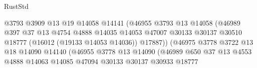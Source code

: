 \begin{lexlean}{RustStd}
\begin{coremodule}
                                            @3793
                                            @3909
                                            @13
                                            @19
                                            @14058
                                            @14141
                                            (@46955
                                              @3793
                                              @13
                                              @14058
                                              (@46989
                                                @397
                                                @37
                                                @13
                                                @4754
                                                @4888
                                                @14035
                                                @14053
                                                @47007
                                                @30133
                                                @30137
                                                @30510
                                                @18777
                                                (@16012 (@19133 @14053 @14036))
                                                @17887))
                                            (@46975
                                              @3778
                                              @3722
                                              @13
                                              @18
                                              @14090
                                              @14140
                                              (@46955
                                                @3778
                                                @13
                                                @14090
                                                (@46989
                                                  @650
                                                  @37
                                                  @13
                                                  @4553
                                                  @4888
                                                  @14063
                                                  @14085
                                                  @47094
                                                  @30133
                                                  @30137
                                                  @30933
                                                  @18777

\end{coremodule}
\end{lexlean}

